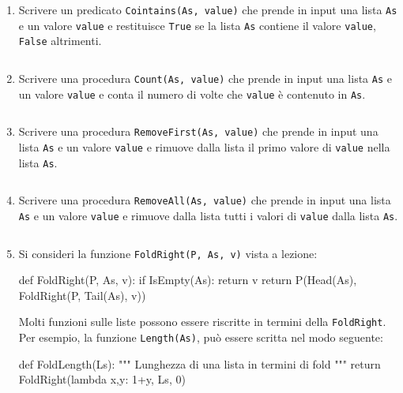 \documentclass[11pt,a4]{article}
\newcommand{\mybox}[2]{$\quad$\fbox{
\begin{minipage}{#1cm}
\hfill\vspace{#2cm}
\end{minipage}
}}
\begin{document}
\begin{enumerate}


\item Scrivere un predicato {\tt Cointains(As, value)} che prende in input una lista {\tt As} e un valore {\tt value} 
e restituisce {\tt True} se la lista {\tt As} contiene il valore {\tt value}, {\tt False} altrimenti.

\mybox{15}{2.0}

\item Scrivere una procedura {\tt Count(As, value)} che prende in input una lista {\tt As} e un valore {\tt value} 
e conta il numero di volte che {\tt value} è contenuto in {\tt As}.

\mybox{15}{2.0}

\item Scrivere una procedura {\tt RemoveFirst(As, value)} che prende in input una lista {\tt As} e un valore {\tt value} 
e rimuove dalla lista il primo valore di {\tt value} nella lista {\tt As}.

\mybox{15}{2.0}

\item Scrivere una procedura {\tt RemoveAll(As, value)} che prende in input una lista {\tt As} e un valore {\tt value} 
e rimuove dalla lista tutti i valori di {\tt value} dalla lista {\tt As}.

\mybox{15}{2.0}


\item Si consideri la funzione {\tt FoldRight(P, As, v)} vista a lezione:

\begin{python}
def FoldRight(P, As, v):
    if IsEmpty(As):
        return v
    return P(Head(As), FoldRight(P, Tail(As), v))
\end{python}

Molti funzioni sulle liste possono essere riscritte in termini della {\tt FoldRight}.
Per esempio, la funzione {\tt Length(As)}, può essere scritta nel modo seguente:
\begin{python}
def FoldLength(Ls):
    """ Lunghezza di una lista in termini di fold """
    return FoldRight(lambda x,y: 1+y, Ls, 0)
\end{python}


\end{enumerate}
\end{document}
